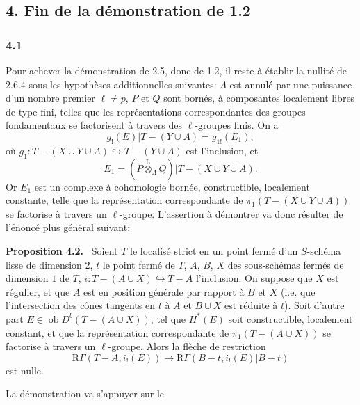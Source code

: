 \documentclass[11pt]{article}
\newenvironment{statement}[1]{\par\medskip\noindent\textbf{#1.}\ }{\par\medskip}
\providecommand{\lten}{\overset{\mathrm L}{\otimes}}
\providecommand{\Ob}{\operatorname{ob}}
\providecommand{\lten}{\overset{\mathrm L}{\otimes}}
\providecommand{\lten}{\overset{\mathrm L}{\otimes}}
\providecommand{\Ob}{\operatorname{ob}}
\providecommand{\lten}{\overset{\mathrm L}{\otimes}}
\providecommand{\lten}{\overset{\mathrm L}{\otimes}}
\providecommand{\Ob}{\operatorname{Ob}}
\providecommand{\lten}{\overset{\mathrm L}{\otimes}}
\providecommand{\Ob}{\operatorname{ob}}
\providecommand{\Ob}{\operatorname{Ob}}
\providecommand{\lten}{\overset{\mathrm L}{\otimes}}
\begin{document}
\subsection*{4. Fin de la démonstration de 1.2}

\subsubsection*{4.1}
Pour achever la démonstration de 2.5, donc de 1.2, il reste à établir la nullité de 2.6.4 sous les hypothèses additionnelles suivantes: $\Lambda$ est annulé par une puissance d'un nombre premier $\ell\ne p$, $P$ et $Q$ sont bornés, à composantes localement libres de type fini, telles que les représentations correspondantes des groupes fondamentaux se factorisent à travers des $\ell$-groupes finis. On a
\[
g_!(E)|T-(Y\cup A)=g_{1!}(E_1),
\]
où $g_1:T-(X\cup Y\cup A)\hookrightarrow T-(Y\cup A)$ est l'inclusion, et
\[
E_1=(P\lten_{\Lambda}Q)|T-(X\cup Y\cup A).
\]
Or $E_1$ est un complexe à cohomologie bornée, constructible, localement constante, telle que la représentation correspondante de $\pi_1(T-(X\cup Y\cup A))$ se factorise à travers un $\ell$-groupe. L'assertion à démontrer va donc résulter de l'énoncé plus général suivant:

\begin{statement}{Proposition 4.2}
Soient $T$ le localisé strict en un point fermé d'un $S$-schéma lisse de dimension $2$, $t$ le point fermé de $T$, $A$, $B$, $X$ des sous-schémas fermés de dimension $1$ de $T$, $i:T-(A\cup X)\hookrightarrow T-A$ l'inclusion. On suppose que $X$ est régulier, et que $A$ est en position générale par rapport à $B$ et $X$ (i.e. que l'intersection des cônes tangents en $t$ à $A$ et $B\cup X$ est réduite à $t$). Soit d'autre part $E\in\Ob D^b(T-(A\cup X))$, tel que $H^*(E)$ soit constructible, localement constant, et que la représentation correspondante de $\pi_1(T-(A\cup X))$ se factorise à travers un $\ell$-groupe. Alors la flèche de restriction
\[
\mathrm R\Gamma(T-A,i_!(E))
\longrightarrow
\mathrm R\Gamma(B-t,i_!(E)|B-t)
\]
est nulle.
\end{statement}

La démonstration va s'appuyer sur le
\end{document}

